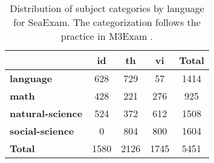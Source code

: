 \begin{table}[h!]
\centering
\small
\begin{tabular}{lcccc}
\toprule
\textbf{}                  & \textbf{id} & \textbf{th} & \textbf{vi} & \textbf{Total} \\
\midrule
\textbf{language}          & 628                 & 729           & 57                 & 1414           \\ 
\textbf{math}              & 428                 & 221           & 276                & 925            \\ 
\textbf{natural-science}   & 524                 & 372           & 612                & 1508           \\ 
\textbf{social-science}    & 0                   & 804           & 800                & 1604           \\ 
\textbf{Total}             & 1580                & 2126          & 1745               & 5451           \\ 
\bottomrule
\end{tabular}
\caption{Distribution of subject categories by language for SeaExam. The categorization follows the practice in M3Exam \cite{zhang_m3exam_2023}.}
\label{tab:stats_m3exam}
\end{table}